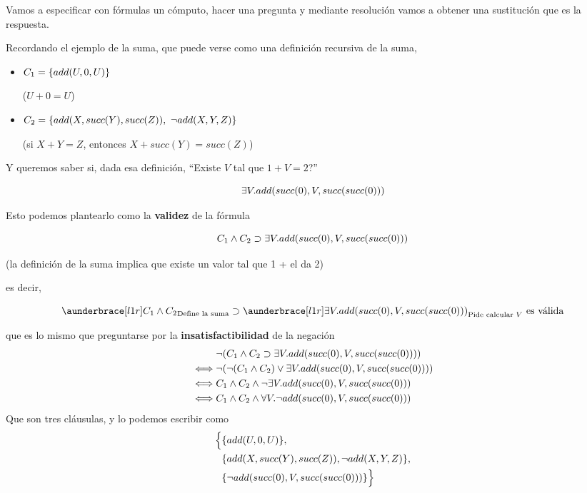 \documentclass{report}
\theoremstyle{definition} %
\begin{document}
Vamos a especificar con fórmulas un cómputo, hacer una pregunta y mediante
resolución vamos a obtener una sustitución que es la respuesta.

Recordando el ejemplo de la suma, que puede verse como una definición recursiva
de la suma,

\begin{itemize}
    \item $C_1 = \{ add(U, 0, U) \}$ 

    ($U + 0 = U$)
    \item $C_2 = \set{add(X, succ(Y), succ(Z)),\ \neg add(X, Y, Z)}$

    (si $X+Y = Z$, entonces $X + succ(Y) = succ(Z)$)
\end{itemize}

Y queremos saber si, dada esa definición, ``Existe $V$ tal que $1 + V = 2$?''

\[
    \exists V . add(succ(0), V, succ(succ(0)))
\]

Esto podemos plantearlo como la \textbf{validez} de la fórmula

\[
    \impl{C_1 \wedge C_2}{
        \existe{V}{add(succ(0), V, succ(succ(0)))}
    }
\]

(la definición de la suma implica que existe un valor tal que 1 + el da 2)

es decir,

\[
    \impl
    {
        \ubrace{C_1 \wedge C_2}{\text{Define la suma}}
    }
    {
        \ubrace{
            \existe{V}{add(succ(0), V, succ(succ(0)))}
        }{\text{Pide calcular } V}
    } \text{ es válida}
\]

que es lo mismo que preguntarse por la \textbf{insatisfactibilidad} de la
negación
\begin{align*}
    &\neg (C_1 \wedge C_2 \supset 
        \exists V . add(succ(0), V, succ(succ(0)))
   )\\
    \iff &\neg (
        \neg (C_1 \wedge C_2) \vee \exists V . add(succ(0), V, succ(succ(0)))
    )\\
    \iff &C_1 \wedge C_2 \wedge \neg\exists V . add(succ(0), V, succ(succ(0)))\\
    \iff &C_1 \wedge C_2 \wedge
        \forall V . \neg add(succ(0), V, succ(succ(0)))
\end{align*}
Que son tres cláusulas, y lo podemos escribir como
\begin{align*}
    \Big\{
        &\{ add(U, 0, U) \},\\
        &\{ add(X, succ(Y), succ(Z)), \neg add(X, Y, Z) \},\\
        &\{ \neg add(succ(0), V, succ(succ(0))) \}
    \Big\}
\end{align*}
\end{document}
